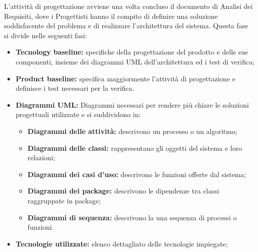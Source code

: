 				L'attività di progettazione avviene una volta concluso il documento di Analisi dei Requisiti, dove i Progettisti hanno il compito di definire una soluzione soddisfacente del problema e di realizzare l'architettura del sistema.
				Questa fase si divide nelle seguenti fasi: 
				\begin{itemize}
					\item \textbf{Tecnology baseline:} specifiche della progettazione del prodotto e delle sue componenti, insieme dei diagrammi UML dell'architettura ed i test di verifica;
					\item \textbf{Product baseline:} specifica maggiormente l'attività di progettazione e definisce i test necessari per la verifica. 
					\item \textbf{Diagrammi UML:} Diagrammi necessari per rendere più chiare le soluzioni progettuali utilizzate e si suddividono in:	
					\begin{itemize}
						\item \textbf{Diagrammi delle attività:} descrivono un processo o un algoritmo;
						\item \textbf{Diagrammi delle classi:} rappresentano gli oggetti del sistema e loro relazioni;
						\item \textbf{Diagrammi dei casi d'uso:} descrivono le funzioni offerte dal sistema;
						\item \textbf{Diagrammi dei package:} descrivono le dipendenze tra classi raggruppate in package;
						\item \textbf{Diagrammi di sequenza:} descrivono la una sequenza di processi o funzioni.
					\end{itemize}
					\item \textbf{Tecnologie utilizzate:} elenco dettagliato delle tecnologie impiegate; 
					\end{itemize}	
				
